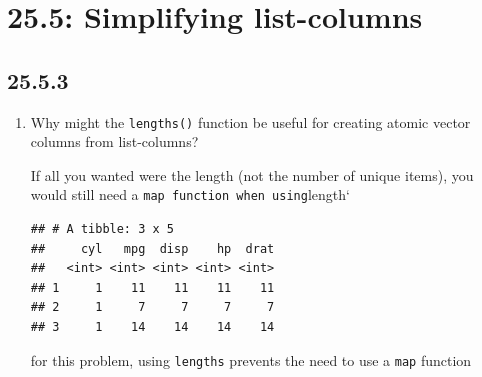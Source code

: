 \documentclass[]{book}
\newenvironment{Shaded}{\begin{snugshade}}{\end{snugshade}}
\newcommand{\DecValTok}[1]{\textcolor[rgb]{0.00,0.00,0.81}{#1}}
\newcommand{\KeywordTok}[1]{\textcolor[rgb]{0.13,0.29,0.53}{\textbf{#1}}}
\newcommand{\NormalTok}[1]{#1}
\newcommand{\OperatorTok}[1]{\textcolor[rgb]{0.81,0.36,0.00}{\textbf{#1}}}
\newcommand{\StringTok}[1]{\textcolor[rgb]{0.31,0.60,0.02}{#1}}
\theoremstyle{definition}
\theoremstyle{definition}
\theoremstyle{definition}
\theoremstyle{remark}
\begin{document}
\hypertarget{simplifying-list-columns}{%
\section{25.5: Simplifying
list-columns}\label{simplifying-list-columns}}

\hypertarget{section-90}{%
\subsection{25.5.3}\label{section-90}}

\begin{enumerate}
\def\labelenumi{\arabic{enumi}.}
\item
  Why might the \texttt{lengths()} function be useful for creating
  atomic vector columns from list-columns?

  If all you wanted were the length (not the number of unique items),
  you would still need a \texttt{map\ function\ when\ using}length`

\begin{Shaded}
\end{Shaded}

\begin{verbatim}
## # A tibble: 3 x 5
##     cyl   mpg  disp    hp  drat
##   <int> <int> <int> <int> <int>
## 1     1    11    11    11    11
## 2     1     7     7     7     7
## 3     1    14    14    14    14
\end{verbatim}

  for this problem, using \texttt{lengths} prevents the need to use a
  \texttt{map} function

\begin{Shaded}
\end{Shaded}


\end{enumerate}
\end{document}
